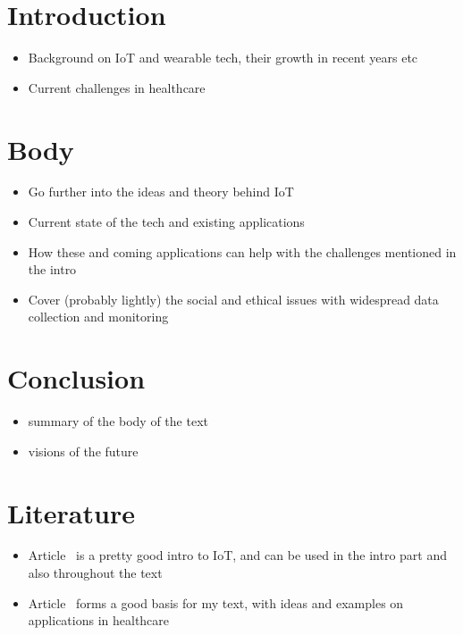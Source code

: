 \section{Introduction}
\label{sec:introduction}

\begin{itemize}
  \item Background on IoT and wearable tech, their growth in recent years etc
  \item Current challenges in healthcare
\end{itemize}


\section{Body}
\label{sec:body}

\begin{itemize}
  \item Go further into the ideas and theory behind IoT
  \item Current state of the tech and existing applications
  \item How these and coming applications can help with the challenges
    mentioned in the intro
  \item Cover (probably lightly) the social and ethical issues with widespread
    data collection and monitoring
\end{itemize}

\section{Conclusion}
\label{sec:conclusion}

\begin{itemize}
  \item summary of the body of the text
  \item visions of the future
\end{itemize}

\section{Literature}
\begin{itemize}
  \item Article~\cite{Gubbi2013} is a pretty good intro to IoT, and can be
    used in the intro part and also throughout the text
  \item Article~\cite{Bui2011} forms a good basis for my text, with ideas and
    examples on applications in healthcare
\end{itemize}
